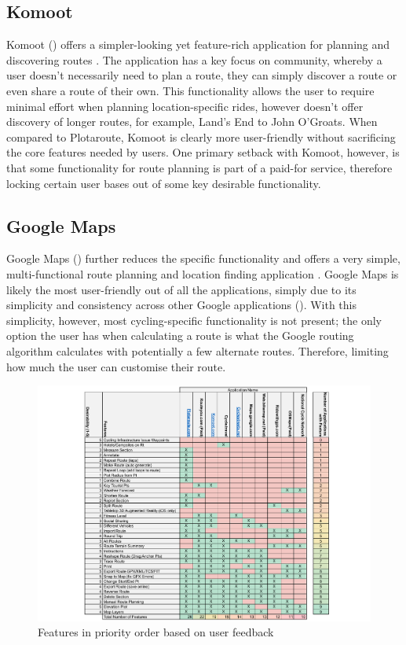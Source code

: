 \subsection{Komoot}
\label{litrev:komoot}
Komoot (\cite{noauthor_komoot_nodate}) offers a simpler-looking yet feature-rich application for planning and discovering routes . The application has a key focus on community, whereby a user doesn't necessarily need to plan a route, they can simply discover a route or even share a route of their own. This functionality allows the user to require minimal effort when planning location-specific rides, however doesn't offer discovery of longer routes, for example, Land's End to John O'Groats. When compared to Plotaroute, Komoot is clearly more user-friendly without sacrificing the core features needed by users. One primary setback with Komoot, however, is that some functionality for route planning is part of a paid-for service, therefore locking certain user bases out of some key desirable functionality.

\subsection{Google Maps}
\label{litrev:gmaps}

Google Maps (\cite{noauthor_google_nodate}) further reduces the specific functionality and offers a very simple, multi-functional route planning and location finding application . Google Maps is likely the most user-friendly out of all the applications, simply due to its simplicity and consistency across other Google applications (\cite{noauthor_material_nodate}). With this simplicity, however, most cycling-specific functionality is not present; the only option the user has when calculating a route is what the Google routing algorithm calculates with potentially a few alternate routes. Therefore, limiting how much the user can customise their route.

\begin{figure}[h!]
    \centering
    \includegraphics[width=1\linewidth]{figures/current_apps.pdf}
    \caption{Features in priority order based on user feedback}
    \label{fig:features}
\end{figure}

